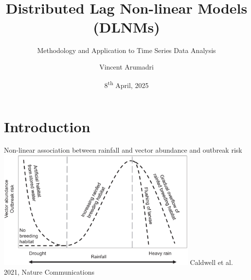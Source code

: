 \documentclass[english]{beamer}
\title{Distributed Lag Non-linear Models (DLNMs)}
\subtitle{Methodology and Application to Time Series Data Analysis }
\author{Vincent Arumadri}
\institute{Department of Public Health \\
\vspace{0.3cm} Erasmus MC}
\date{8\textsuperscript{th} April, 2025}
\begin{document}
\begin{frame}
    \titlepage
\end{frame}
\section{Introduction}
\begin{frame}{Non-linear association between rainfall and vector abundance and outbreak risk}
    \centering
    \includegraphics[width=10cm,keepaspectratio]{images/nonlinear_effect_outbreaks.png}
    \vspace{0.3cm}
    {\footnotesize Caldwell et al. 2021, Nature Communications}
\end{frame}
\end{document}

